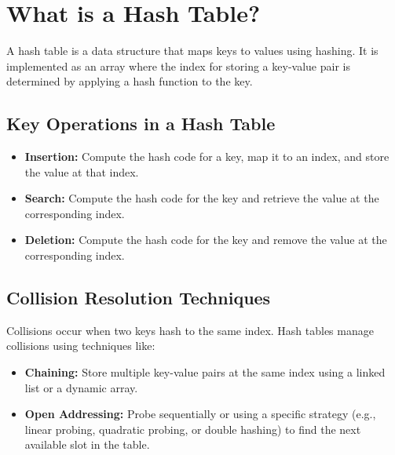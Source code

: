 \section*{What is a Hash Table?}
A hash table is a data structure that maps keys to values using hashing. It is implemented as an array where the index for storing a key-value pair is determined by applying a hash function to the key.

\subsection*{Key Operations in a Hash Table}
\begin{itemize}
    \item \textbf{Insertion:} Compute the hash code for a key, map it to an index, and store the value at that index.
    \item \textbf{Search:} Compute the hash code for the key and retrieve the value at the corresponding index.
    \item \textbf{Deletion:} Compute the hash code for the key and remove the value at the corresponding index.
\end{itemize}

\subsection*{Collision Resolution Techniques}
Collisions occur when two keys hash to the same index. Hash tables manage collisions using techniques like:
\begin{itemize}
    \item \textbf{Chaining:} Store multiple key-value pairs at the same index using a linked list or a dynamic array.
    \item \textbf{Open Addressing:} Probe sequentially or using a specific strategy (e.g., linear probing, quadratic probing, or double hashing) to find the next available slot in the table.
\end{itemize}

